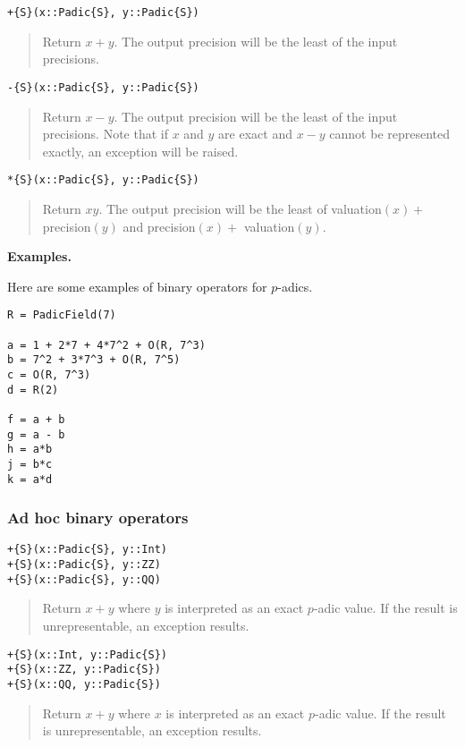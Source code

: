 \documentclass[a4paper,10pt]{article}
\newcommand{\desc}[1]{\vspace{-3mm}\begin{quote}#1\end{quote}}
\begin{document}
{{\begin{lstlisting}
+{S}(x::Padic{S}, y::Padic{S})
\end{lstlisting}

\desc{Return $x + y$. The output precision will be the least of the input
precisions.}

\begin{lstlisting}
-{S}(x::Padic{S}, y::Padic{S})
\end{lstlisting}

\desc{Return $x - y$. The output precision will be the least of the input
precisions. Note that if $x$ and $y$ are exact and $x - y$ cannot be
represented exactly, an exception will be raised.}

\begin{lstlisting}
*{S}(x::Padic{S}, y::Padic{S})
\end{lstlisting}

\desc{Return $xy$. The output precision will be the least of valuation$(x) +$
precision$(y)$ and precision$(x) +$ valuation$(y)$.}

\textbf{Examples.}

Here are some examples of binary operators for $p$-adics.

\begin{lstlisting}
R = PadicField(7)

a = 1 + 2*7 + 4*7^2 + O(R, 7^3)
b = 7^2 + 3*7^3 + O(R, 7^5)
c = O(R, 7^3)
d = R(2)

f = a + b
g = a - b
h = a*b
j = b*c
k = a*d
\end{lstlisting}

\subsubsection{Ad hoc binary operators}

\begin{lstlisting}
+{S}(x::Padic{S}, y::Int)
+{S}(x::Padic{S}, y::ZZ)
+{S}(x::Padic{S}, y::QQ)
\end{lstlisting}

\desc{Return $x + y$ where $y$ is interpreted as an exact $p$-adic value. If
the result is unrepresentable, an exception results.}

\begin{lstlisting}
+{S}(x::Int, y::Padic{S})
+{S}(x::ZZ, y::Padic{S})
+{S}(x::QQ, y::Padic{S})
\end{lstlisting}

\desc{Return $x + y$ where $x$ is interpreted as an exact $p$-adic value. If
the result is unrepresentable, an exception results.}

}}
\end{document}
